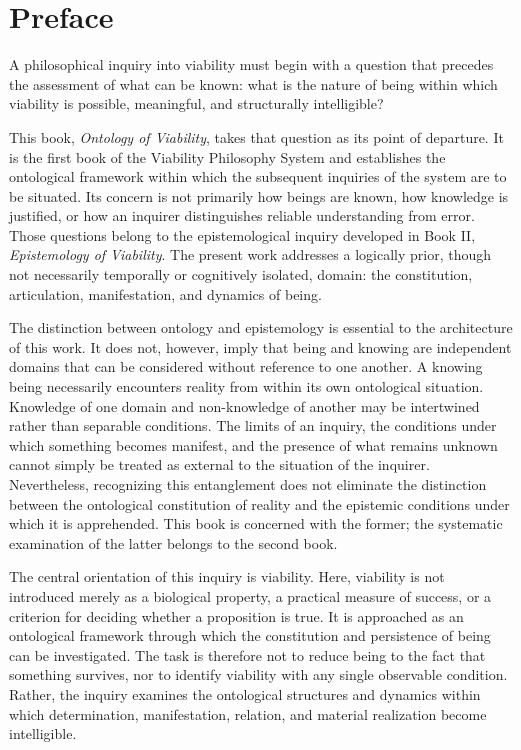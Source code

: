 
\cleardoublepage

\chapter*{Preface}

{}

A philosophical inquiry into viability must begin with a question
that precedes the assessment of what can be known: what is the
nature of being within which viability is possible, meaningful,
and structurally intelligible?

This book, \textit{Ontology of Viability}, takes that question
as its point of departure. It is the first book of the Viability
Philosophy System and establishes the ontological framework
within which the subsequent inquiries of the system are to be
situated. Its concern is not primarily how beings are known,
how knowledge is justified, or how an inquirer distinguishes
reliable understanding from error. Those questions belong to
the epistemological inquiry developed in Book II,
\textit{Epistemology of Viability}. The present work addresses
a logically prior, though not necessarily temporally or
cognitively isolated, domain: the constitution, articulation,
manifestation, and dynamics of being.

The distinction between ontology and epistemology is essential
to the architecture of this work. It does not, however, imply
that being and knowing are independent domains that can be
considered without reference to one another. A knowing being
necessarily encounters reality from within its own ontological
situation. Knowledge of one domain and non-knowledge of another
may be intertwined rather than separable conditions. The limits
of an inquiry, the conditions under which something becomes
manifest, and the presence of what remains unknown cannot
simply be treated as external to the situation of the inquirer.
Nevertheless, recognizing this entanglement does not eliminate
the distinction between the ontological constitution of reality
and the epistemic conditions under which it is apprehended.
This book is concerned with the former; the systematic
examination of the latter belongs to the second book.

The central orientation of this inquiry is viability. Here,
viability is not introduced merely as a biological property,
a practical measure of success, or a criterion for deciding
whether a proposition is true. It is approached as an
ontological framework through which the constitution and
persistence of being can be investigated. The task is therefore
not to reduce being to the fact that something survives, nor
to identify viability with any single observable condition.
Rather, the inquiry examines the ontological structures and
dynamics within which determination, manifestation, relation,
and material realization become intelligible.

